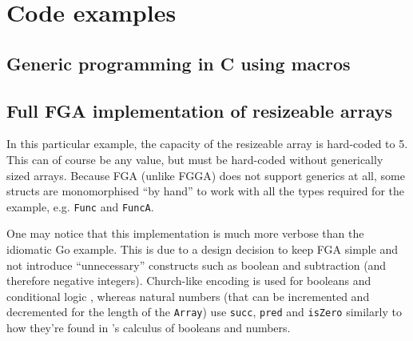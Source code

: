 \section{Code examples}

\subsection{Generic programming in C using macros}
\label{sec:generic-c}




\subsection{Full FGA implementation of resizeable arrays}
\label{sec:fg-resizable-array-code}

In this particular example, the capacity of the resizeable array is hard-coded
to 5. This can of course be any value, but must be hard-coded without
generically sized arrays. Because FGA (unlike FGGA) does not support generics at
all, some structs are monomorphised ``by hand'' to work with all the types
required for the example, e.g. \texttt{Func} and \texttt{FuncA}.

One may notice that this implementation is much more verbose than the idiomatic
Go example. This is due to a design decision to keep FGA simple and not
introduce ``unnecessary'' constructs such as boolean and subtraction (and
therefore negative integers). Church-like encoding is used for booleans and
conditional logic \autocite{lambdaCalculus}, whereas natural numbers (that can
be incremented and decremented for the length of the \texttt{Array}) use
\texttt{succ}, \texttt{pred} and \texttt{isZero} similarly to how they're found
in \textcite{tapl}'s calculus of booleans and numbers.


